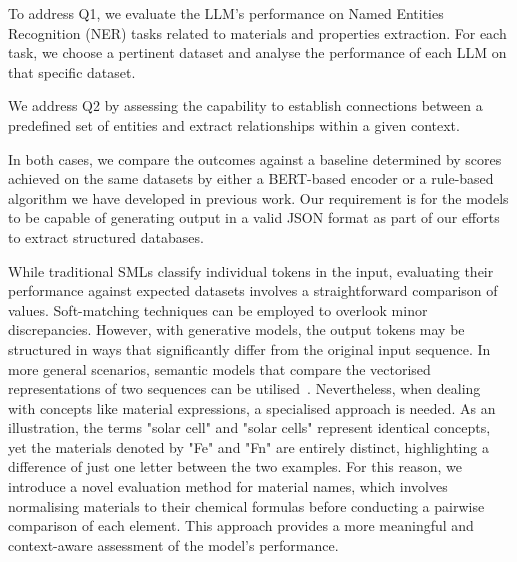 \documentclass[a4paper]{article}
\begin{document}
To address Q1, we evaluate the LLM's performance on Named Entities Recognition (NER) tasks related to materials and properties extraction.
For each task, we choose a pertinent dataset and analyse the performance of each LLM on that specific dataset.


We address Q2 by assessing the capability to establish connections between a predefined set of entities and extract relationships within a given context.  

In both cases, we compare the outcomes against a baseline determined by scores achieved on the same datasets by either a BERT-based encoder or a rule-based algorithm we have developed in previous work.
Our requirement is for the models to be capable of generating output in a valid JSON format as part of our efforts to extract structured databases.
 
While traditional SMLs classify individual tokens in the input, evaluating their performance against expected datasets involves a straightforward comparison of values. Soft-matching techniques can be employed to overlook minor discrepancies. 
However, with generative models, the output tokens may be structured in ways that significantly differ from the original input sequence. 
In more general scenarios, semantic models that compare the vectorised representations of two sequences can be utilised~\cite{reimers2019sentencebert}. 
Nevertheless, when dealing with concepts like material expressions, a specialised approach is needed. 
As an illustration, the terms "solar cell" and "solar cells" represent identical concepts, yet the materials denoted by "Fe" and "Fn" are entirely distinct, highlighting a difference of just one letter between the two examples.
For this reason, we introduce a novel evaluation method for material names, which involves normalising materials to their chemical formulas before conducting a pairwise comparison of each element. This approach provides a more meaningful and context-aware assessment of the model's performance.
\end{document}
